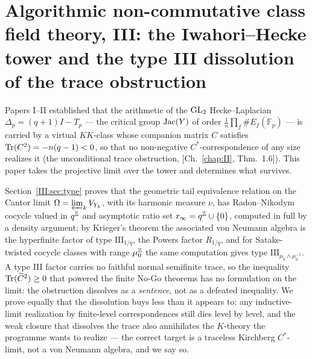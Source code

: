\chapter[III. The Iwahori--Hecke tower and the type III dissolution of the trace obstruction]{Algorithmic non-commutative class field theory, III: the Iwahori--Hecke tower and the type III dissolution of the trace obstruction}\label{chap:III}
\begin{chapterabstract}
Papers I--II established that the arithmetic of the $\mathrm{GL}_2$ Hecke--Laplacian
$\Delta_p=(q+1)I-T_p$ --- the critical group $\operatorname{Jac}(Y)$ of order
$\frac1n\prod_f\#E_f(\mathbb F_p)$ --- is carried by a virtual $KK$-class whose
companion matrix $C$ satisfies $\operatorname{Tr}(C^2)=-n(q-1)<0$, so that no non-negative
$C^*$-correspondence of any size realizes it (the unconditional trace obstruction,
[Ch.~\ref{chap:II}, Thm.~1.6]). This paper takes the projective limit over the tower and determines
what survives.

Section~\ref{III:sec:type} proves that the geometric tail equivalence relation on the
Cantor limit $\Omega=\varprojlim_kV_{Y_k}$, with its harmonic measure $\nu$, has
Radon--Nikodym cocycle valued in $q^{\mathbb{Z}}$ and asymptotic ratio set
$r_\infty=q^{\mathbb{Z}}\cup\{0\}$, computed in full by a density argument; by
Krieger's theorem the associated von Neumann algebra is the hyperfinite factor of type
$\mathrm{III}_{1/q}$, the Powers factor $R_{1/q}$, and for Satake-twisted cocycle
classes with range $\mu_0^{\mathbb{Z}}$ the same computation gives type
$\mathrm{III}_{\mu_0\wedge\mu_0^{-1}}$. A type III factor carries no faithful normal
semifinite trace, so the inequality $\operatorname{Tr}(\widetilde C^2)\ge0$ that powered the finite
No-Go theorems has no formulation on the limit: the obstruction dissolves as a
\emph{sentence}, not as a defeated inequality. We prove equally that the dissolution
buys less than it appears to: any inductive-limit realization by finite-level
correspondences still dies level by level, and the weak closure that dissolves the
trace also annihilates the $K$-theory the programme wants to realize --- the correct
target is a traceless Kirchberg $C^*$-limit, not a von Neumann algebra, and we say so.


\end{chapterabstract}
